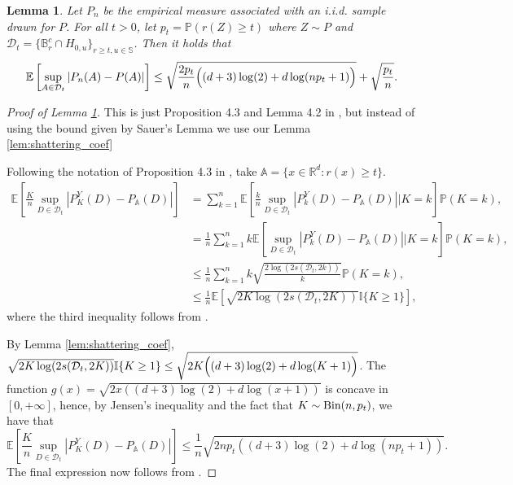 \documentclass{article}
\numberwithin{equation}{section}
\newtheorem{lemma}{Lemma}[section]
\newcommand{\R}{\mathbb{R}}
\newcommand{\I}{\mathbb{I}}
\renewcommand{\P}{\mathbb{P}}
\newcommand{\E}{\mathbb{E}}
\newcommand{\sphere}{\mathbb{S}}
\newcommand{\ball}{\mathbb{B}}
\begin{document}
\begin{lemma}\label{lem:bound_expectation} Let \(P_n\) be the
    empirical measure associated with
    an i.i.d. sample drawn for \(P\). For all \(t>0\), let
    \(p_t=\P(r(Z)\geq t)\) where \(Z\sim P\) and
    \(\mathcal{D}_t=\{\ball_{r}^c\cap H_{0,u}\}_{
    r\geq t,
    u\in\sphere}\). Then it holds that
    \begin{equation*}
        \E \left[ \sup_{A\in\mathcal{D}_t} \left| P_n(A) - P(A) \right|
        \right]\leq\sqrt{\frac{2p_t}{n}\Bigl( (d+3)\log(2) +
        d\log(np_t+1) \Bigr)} + \sqrt{\frac{p_t}{n}}.
    \end{equation*}
\end{lemma}
\begin{proof}[Proof of Lemma \ref{lem:bound_expectation}]
    This is just Proposition 4.3 and Lemma 4.2 in
    \cite{lhaut2022uniform},
    but instead of using the bound given by Sauer's Lemma we use our
    Lemma \ref{lem:shattering_coef}

    Following the notation of Proposition 4.3 in
    \cite{lhaut2022uniform}, take
    \(\mathbb{A}=\{x\in\R^d: r(x)\geq t\}\).
    \begin{align*}
        \E \left[ \frac{K}{n} \sup_{D\in\mathcal{D}_t}
        \left|P^Y_K(D)-P_{\mathbb{A}}(D)\right| \right] & =
        \sum_{k=1}^{n}{ \E \left[ \frac{k}{n}
                \sup_{D\in\mathcal{D}_t}\left| P_k^Y(D) - P_{\mathbb{A}}(D)
        \right| \Bigr| K=k \right]\P(K=k) },
        \\
        & = \frac{1}{n}\sum_{k=1}^{n}{k \E
            \left[\sup_{D\in\mathcal{D}_t} \left| P_k^Y(D) -
        P_{\mathbb{A}}(D) \right| \Bigr| K=k \right]\P(K=k) },
        \\
        & \leq \frac{1}{n}\sum_{k=1}^{n}{k\sqrt{\frac{2
        \log(2s(\mathcal{D}_t, 2k))}{k}}\P(K=k)},
        \\
        & \leq\frac{1}{n} \E \left[ \sqrt{2K \log (2
        s(\mathcal{D}_t,2K))} \I\{K\geq 1\} \right],
    \end{align*}
    where the third inequality follows from \cite[Theorem
    1.9]{lugosi2002pattern}.

    By Lemma \ref{lem:shattering_coef}, \(\sqrt{2K \log (2
        s(\mathcal{D}_t,2K))} \I\{K\geq 1\} \leq \sqrt{2K \Bigl(
    (d+3)\log(2)+d\log(K+1) \Bigr)}\).
    The function \(g(x)=\sqrt{2x\left((d+3)\log(2)+d\log(x+1)\right)}\)
    is concave in \([0,+\infty]\), hence,
    by Jensen's inequality and the fact that
    \(K\sim\textnormal{Bin}(n,p_t)\), we have that
    \begin{equation*}
        \E \left[ \frac{K}{n} \sup_{D\in\mathcal{D}_t}
        \left|P^Y_K(D)-P_{\mathbb{A}}(D)\right| \right] \leq
        \frac{1}{n} \sqrt{2np_t{\left( (d+3)\log(2)+d\log(np_t+1) \right)}}.
    \end{equation*}
    The final expression now follows from \cite[Lemma
    4.2]{lhaut2022uniform}.
\end{proof}
\end{document}
